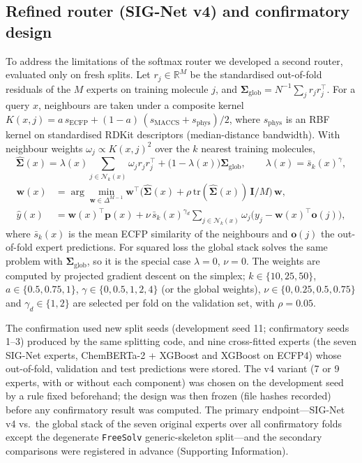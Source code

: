 \subsection{Refined router (SIG-Net v4) and confirmatory design}
To address the limitations of the softmax router we developed a second router, evaluated only on fresh splits. Let $r_j \in \mathbb{R}^M$ be the standardised out-of-fold residuals of the $M$ experts on training molecule $j$, and $\boldsymbol{\Sigma}_{\mathrm{glob}} = N^{-1}\sum_j r_j r_j^\top$. For a query $x$, neighbours are taken under a composite kernel $K(x,j) = a\,s_{\mathrm{ECFP}} + (1-a)\,(s_{\mathrm{MACCS}} + s_{\mathrm{phys}})/2$, where $s_{\mathrm{phys}}$ is an RBF kernel on standardised RDKit descriptors (median-distance bandwidth). With neighbour weights $\omega_j \propto K(x,j)^2$ over the $k$ nearest training molecules,
\begin{equation}
\hat{\boldsymbol{\Sigma}}(x) = \lambda(x)\sum_{j \in \mathcal{N}_k(x)} \omega_j r_j r_j^\top + \bigl(1-\lambda(x)\bigr)\boldsymbol{\Sigma}_{\mathrm{glob}}, \qquad \lambda(x) = \bar{s}_k(x)^{\gamma},
\end{equation}
\begin{equation}
\begin{aligned}
\mathbf{w}(x) &= \arg\min_{\mathbf{w} \in \Delta^{M-1}} \mathbf{w}^\top \bigl(\hat{\boldsymbol{\Sigma}}(x) + \rho\,\mathrm{tr}(\hat{\boldsymbol{\Sigma}}(x))\,\mathbf{I}/M\bigr)\,\mathbf{w}, \\
\hat{y}(x) &= \mathbf{w}(x)^\top \mathbf{p}(x) + \nu\,\bar{s}_k(x)^{\gamma_d} \sum_{j \in \mathcal{N}_k(x)} \omega_j \bigl(y_j - \mathbf{w}(x)^\top \mathbf{o}(j)\bigr),
\end{aligned}
\end{equation}
where $\bar{s}_k(x)$ is the mean ECFP similarity of the neighbours and $\mathbf{o}(j)$ the out-of-fold expert predictions. For squared loss the global stack solves the same problem with $\boldsymbol{\Sigma}_{\mathrm{glob}}$, so it is the special case $\lambda = 0$, $\nu = 0$. The weights are computed by projected gradient descent on the simplex; $k \in \{10, 25, 50\}$, $a \in \{0.5, 0.75, 1\}$, $\gamma \in \{0, 0.5, 1, 2, 4\}$ (or the global weights), $\nu \in \{0, 0.25, 0.5, 0.75\}$ and $\gamma_d \in \{1, 2\}$ are selected per fold on the validation set, with $\rho = 0.05$.

The confirmation used new split seeds (development seed 11; confirmatory seeds 1--3) produced by the same splitting code, and nine cross-fitted experts (the seven SIG-Net experts, ChemBERTa-2 + XGBoost and XGBoost on ECFP4) whose out-of-fold, validation and test predictions were stored. The v4 variant (7 or 9 experts, with or without each component) was chosen on the development seed by a rule fixed beforehand; the design was then frozen (file hashes recorded) before any confirmatory result was computed. The primary endpoint---SIG-Net v4 vs.\ the global stack of the seven original experts over all confirmatory folds except the degenerate \texttt{FreeSolv} generic-skeleton split---and the secondary comparisons were registered in advance (Supporting Information).

